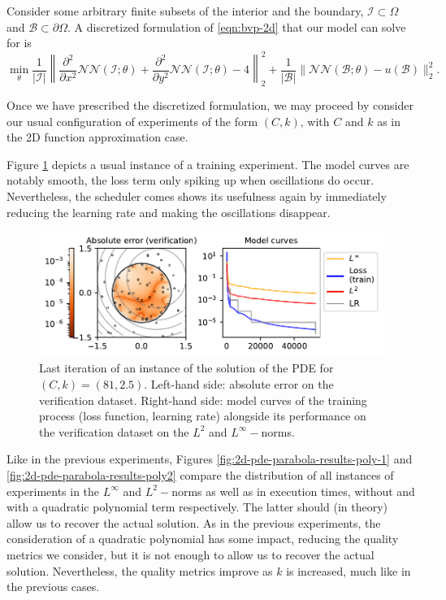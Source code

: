 \documentclass[12pt]{report} %
\begin{document}
Consider some arbitrary finite subsets of the interior and the boundary,
$\mathcal{I} \subset \Omega$ and $\mathcal{B} \subset \partial \Omega$. A
discretized formulation of \eqref{eqn:bvp-2d} that our model can solve for is
\[ \min_{\theta} \frac{1}{| \mathcal{I} |} \left\| \frac{\partial^2}{\partial
    x^2} \mathcal{N}\mathcal{N} (\mathcal{I}; \theta) +
  \frac{\partial^2}{\partial y^2} \mathcal{N}\mathcal{N} (\mathcal{I};
  \theta) - 4 \right\|_2^2 + \frac{1}{| \mathcal{B} |} \|
  \mathcal{N}\mathcal{N} (\mathcal{B}; \theta) - u (\mathcal{B}) \|_2^2 . \]

Once we have prescribed the discretized formulation, we may proceed by consider our usual configuration of experiments of the form $(C,k)$, with $C$ and $k$ as in the 2D function approximation case.

Figure \ref{fig:2d-pde-usual-result} depicts a usual instance of a training experiment. The model curves are notably smooth, the loss term only spiking up when oscillations do occur. Nevertheless, the scheduler comes shows its usefulness again by immediately reducing the learning rate and making the oscillations disappear.

\begin{figure}[h]
  \includegraphics[width=\textwidth]{imagenes/experiments/2d/pde_parabola/parabola-TR15-C81-rrrrepetishon-E52502.pdf}
  \caption{Last iteration of an instance of the solution of the PDE for $(C,k)=(81,2.5)$. Left-hand side: absolute error on the verification dataset. Right-hand side: model curves of the training process (loss function, learning rate) alongside its performance on the verification dataset on the $L^2$ and $L^\infty-$norms.}
  \label{fig:2d-pde-usual-result}
\end{figure}

Like in the previous experiments, Figures \ref{fig:2d-pde-parabola-results-poly-1} and \ref{fig:2d-pde-parabola-results-poly2} compare the distribution of all instances of experiments in the $L^\infty$ and $L^2-$norms as well as in execution times, without and with a quadratic polynomial term respectively. The latter should (in theory) allow us to recover the actual solution. As in the previous experiments, the consideration of a quadratic polynomial has some impact, reducing the quality metrics we consider, but it is not enough to allow us to recover the actual solution. Nevertheless, the quality metrics improve as $k$ is increased, much like in the previous cases.
\end{document}
